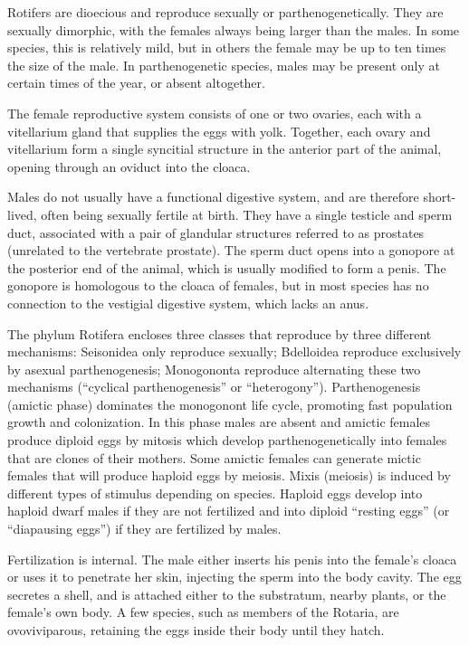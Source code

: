 Rotifers are dioecious and reproduce sexually or parthenogenetically. They are sexually dimorphic, with the females always being larger than the males. In some species, this is relatively mild, but in others the female may be up to ten times the size of the male. In parthenogenetic species, males may be present only at certain times of the year, or absent altogether.

The female reproductive system consists of one or two ovaries, each with a vitellarium gland that supplies the eggs with yolk. Together, each ovary and vitellarium form a single syncitial structure in the anterior part of the animal, opening through an oviduct into the cloaca.

Males do not usually have a functional digestive system, and are therefore short-lived, often being sexually fertile at birth. They have a single testicle and sperm duct, associated with a pair of glandular structures referred to as prostates (unrelated to the vertebrate prostate). The sperm duct opens into a gonopore at the posterior end of the animal, which is usually modified to form a penis. The gonopore is homologous to the cloaca of females, but in most species has no connection to the vestigial digestive system, which lacks an anus.

The phylum Rotifera encloses three classes that reproduce by three different mechanisms: Seisonidea only reproduce sexually; Bdelloidea reproduce exclusively by asexual parthenogenesis; Monogononta reproduce alternating these two mechanisms (``cyclical parthenogenesis'' or ``heterogony''). Parthenogenesis (amictic phase) dominates the monogonont life cycle, promoting fast population growth and colonization. In this phase males are absent and amictic females produce diploid eggs by mitosis which develop parthenogenetically into females that are clones of their mothers. Some amictic females can generate mictic females that will produce haploid eggs by meiosis. Mixis (meiosis) is induced by different types of stimulus depending on species. Haploid eggs develop into haploid dwarf males if they are not fertilized and into diploid ``resting eggs'' (or ``diapausing eggs'') if they are fertilized by males.

Fertilization is internal. The male either inserts his penis into the female's cloaca or uses it to penetrate her skin, injecting the sperm into the body cavity. The egg secretes a shell, and is attached either to the substratum, nearby plants, or the female's own body. A few species, such as members of the Rotaria, are ovoviviparous, retaining the eggs inside their body until they hatch.

